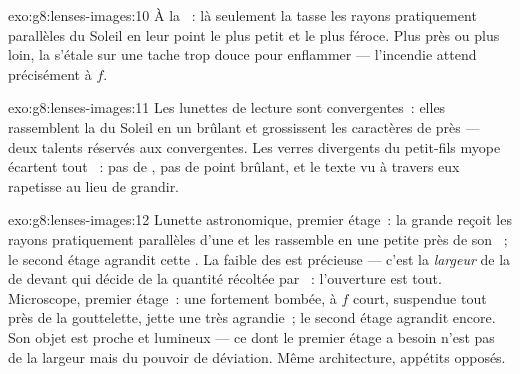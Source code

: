 \begin{solution}{exo:g8:lenses-images:10}
À la ~: là seulement la  tasse les rayons
pratiquement parallèles du Soleil en leur point le plus petit et le
plus féroce. Plus près ou plus loin, la  s'étale sur une tache
trop douce pour enflammer --- l'incendie attend précisément à $f$.
\end{solution}

\begin{solution}{exo:g8:lenses-images:11}
Les lunettes de lecture sont convergentes~: elles rassemblent la
 du Soleil en un  brûlant et grossissent les caractères de
près --- deux talents réservés aux convergentes. Les verres divergents
du petit-fils myope écartent tout ~: pas de , pas de
point brûlant, et le texte vu à travers eux rapetisse au lieu de
grandir.
\end{solution}

\begin{solution}{exo:g8:lenses-images:12}
Lunette astronomique, premier étage~: la grande  reçoit les
rayons pratiquement parallèles d'une  et les rassemble en une
petite  près de son ~; le second étage agrandit cette
. La faible  des  est précieuse --- c'est la
\emph{largeur} de la  de devant qui décide de la quantité
récoltée par ~: l'ouverture est tout. Microscope, premier
étage~: une  fortement bombée, à $f$ court, suspendue tout
près de la gouttelette, jette une  très agrandie~; le
second étage agrandit encore. Son objet est proche et lumineux --- ce
dont le premier étage a besoin n'est pas de la largeur mais du pouvoir
de déviation. Même architecture, appétits opposés.
\end{solution}

